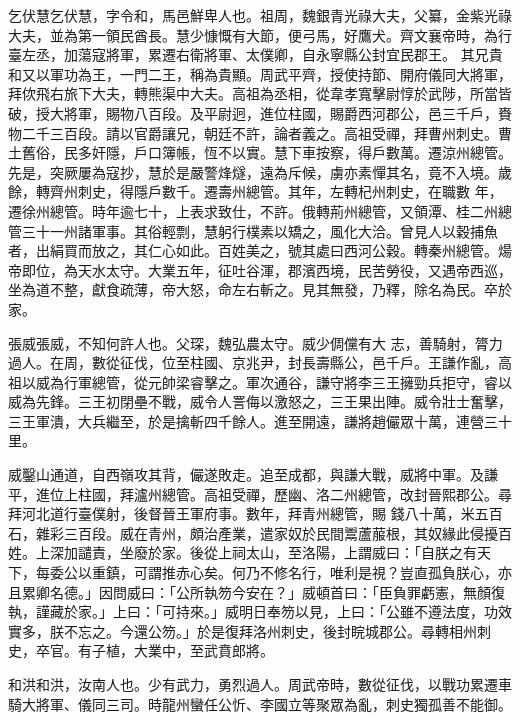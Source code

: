 \begin{pinyinscope}
 乞伏慧乞伏慧，字令和，馬邑鮮卑人也。祖周，魏銀青光祿大夫，父纂，金紫光祿大夫，並為第一領民酋長。慧少慷慨有大節，便弓馬，好鷹犬。齊文襄帝時，為行臺左丞，加蕩寇將軍，累遷右衛將軍、太僕卿，自永寧縣公封宜民郡王。
 其兄貴和又以軍功為王，一門二王，稱為貴顯。周武平齊，授使持節、開府儀同大將軍，拜佽飛右旅下大夫，轉熊渠中大夫。高祖為丞相，從韋孝寬擊尉惇於武陟，所當皆破，授大將軍，賜物八百段。及平尉迥，進位柱國，賜爵西河郡公，邑三千戶，賚物二千三百段。請以官爵讓兄，朝廷不許，論者義之。高祖受禪，拜曹州刺史。曹土舊俗，民多奸隱，戶口簿帳，恆不以實。慧下車按察，得戶數萬。遷涼州總管。先是，突厥屢為寇抄，慧於是嚴警烽燧，遠為斥候，虜亦素憚其名，竟不入境。歲餘，轉齊州刺史，得隱戶數千。遷壽州總管。其年，左轉杞州刺史，在職數
 年，遷徐州總管。時年逾七十，上表求致仕，不許。俄轉荊州總管，又領潭、桂二州總管三十一州諸軍事。其俗輕剽，慧躬行樸素以矯之，風化大洽。曾見人以穀捕魚者，出絹買而放之，其仁心如此。百姓美之，號其處曰西河公穀。轉秦州總管。煬帝即位，為天水太守。大業五年，征吐谷渾，郡濱西境，民苦勞役，又遇帝西巡，坐為道不整，獻食疏薄，帝大怒，命左右斬之。見其無發，乃釋，除名為民。卒於家。



 張威張威，不知何許人也。父琛，魏弘農太守。威少倜儻有大
 志，善騎射，膂力過人。在周，數從征伐，位至柱國、京兆尹，封長壽縣公，邑千戶。王謙作亂，高祖以威為行軍總管，從元帥梁睿擊之。軍次通谷，謙守將李三王擁勁兵拒守，睿以威為先鋒。三王初閉壘不戰，威令人詈侮以激怒之，三王果出陣。威令壯士奮擊，三王軍潰，大兵繼至，於是擒斬四千餘人。進至開遠，謙將趙儼眾十萬，連營三十里。



 威鑿山通道，自西嶺攻其背，儼遂敗走。追至成都，與謙大戰，威將中軍。及謙平，進位上柱國，拜瀘州總管。高祖受禪，歷幽、洛二州總管，改封晉熙郡公。尋拜河北道行臺僕射，後督晉王軍府事。數年，拜青州總管，賜
 錢八十萬，米五百石，雜彩三百段。威在青州，頗治產業，遣家奴於民間鬻蘆菔根，其奴緣此侵擾百姓。上深加譴責，坐廢於家。後從上祠太山，至洛陽，上謂威曰：「自朕之有天下，每委公以重鎮，可謂推赤心矣。何乃不修名行，唯利是視？豈直孤負朕心，亦且累卿名德。」因問威曰：「公所執笏今安在？」威頓首曰：「臣負罪虧憲，無顏復執，謹藏於家。」上曰：「可持來。」威明日奉笏以見，上曰：「公雖不遵法度，功效實多，朕不忘之。今還公笏。」於是復拜洛州刺史，後封睆城郡公。尋轉相州刺史，卒官。有子植，大業中，至武賁郎將。



 和洪和洪，汝南人也。少有武力，勇烈過人。周武帝時，數從征伐，以戰功累遷車騎大將軍、儀同三司。時龍州蠻任公忻、李國立等聚眾為亂，刺史獨孤善不能御。




\end{pinyinscope}
